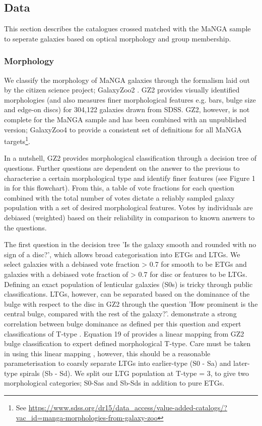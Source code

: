 \subsection{Data} \label{sec:data_obs}
This section describes the catalogues crossed matched with the MaNGA sample to seperate galaxies based on optical morphology and group membership.

\subsubsection{Morphology} \label{sec:morph_def_obs}
We classify the morphology of MaNGA galaxies through the formalism laid out by the citizen science project; GalaxyZoo2 \citep[GZ2;][]{willett2013}. GZ2 provides visually identified morphologies (and also measures finer morphological features e.g. bars, bulge size and edge-on discs) for 304,122 galaxies drawn from SDSS. GZ2, however, is not complete for the MaNGA sample and has been combined with an unpublished version; GalaxyZoo4 to provide a consistent set of definitions for all MaNGA targets\footnote{See \url{https://www.sdss.org/dr15/data_access/value-added-catalogs/?vac_id=manga-morphologies-from-galaxy-zoo}}. 

In a nutshell, GZ2 provides morphological classification through a decision tree of questions. Further questions are dependent on the answer to the previous to characterise a certain morphological type and identify finer features (see Figure 1 in \citet{willett2013} for this flowchart). From this, a table of vote fractions for each question combined with the total number of votes dictate a reliably sampled galaxy population with a set of desired morphological features. Votes by individuals are debiased (weighted) based on their reliability in comparison to known answers to the questions.

The first question in the decision tree 'Is the galaxy smooth and rounded with no sign of a disc?', which allows broad categorisation into ETGs and LTGs. We select galaxies with a debiased vote fraction > 0.7 for smooth to be ETGs and galaxies with a debiased vote fraction of > 0.7 for disc or features to be LTGs. Defining an exact population of lenticular galaxies (S0s) is tricky through public classifications. LTGs, however, can be separated based on the dominance of the bulge with respect to the disc in GZ2 through the question 'How prominent is the central bulge, compared with the rest of the galaxy?'. \citet{willett2013} demonstrate a strong correlation between bulge dominance as defined per this question and expert classifications of T-type \citep{nair2010}. Equation 19 of \citet{willett2013} provides a linear mapping from GZ2 bulge classification to expert defined morphological T-type. Care must be taken in using this linear mapping \citep[see discussion in][]{willett2013}, however, this should be a reasonable parameterisation to coarsly separate LTGs into earlier-type (S0 - Sa) and later-type spirals (Sb - Sd). We split our LTG population at T-type = 3, to give two morphological categories; S0-Sas and Sb-Sds in addition to pure ETGs.

